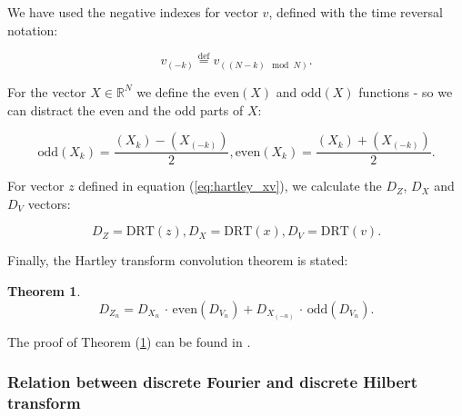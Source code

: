 \documentclass[12pt,twoside,a4paper]{article}
\numberwithin{equation}{subsection}
\numberwithin{figure}{subsection}
\newtheorem{thm}{Theorem}
\begin{document}
We have used the negative indexes for vector $v$, defined with the time reversal notation:

\begin{equation} \label{eq:hartley_negindex}
   v_{(-k)} \stackrel{\mathrm{def}}{=} v_{((N - k) \mod N)} .
\end{equation}

For the vector $X \in \mathbb{R} ^ N $ we define the $ \mathrm{even}(X) $ and $ \mathrm{odd}(X) $ functions - so we can distract the even and the odd parts of $X$:

\begin{subequations} \label{eq:hartley_oddeven}
	\begin{equation} \label{eq:hartley_odd}
		\mathrm{odd}(X_k)  = \frac{(X_k) - (X_{(-k)})}{2} ,
	\end{equation}
	\begin{equation} \label{eq:hartley_even}
		\mathrm{even}(X_k) = \frac{(X_k) + (X_{(-k)})}{2} .
	\end{equation}
\end{subequations}

For vector $z$ defined in equation (\ref{eq:hartley_xv}), we calculate the $D_Z$, $D_X$ and $D_V$ vectors:

\begin{subequations}
	\begin{equation}
		D_Z = \mathrm{DRT}(z),
    \end{equation}
    \begin{equation} 
		D_X = \mathrm{DRT}(x),
	\end{equation}
    \begin{equation} 
		D_V = \mathrm{DRT}(v).
	\end{equation}
\end{subequations}    

Finally, the Hartley transform convolution theorem is stated:

\begin{thm} \label{eq:hartley_theorem}
  \begin{equation}
			D_{Z_n} = D_{X_n}      \, \cdot \, \mathrm{even}(D_{V_n}) 
        	    + D_{X_{(-n)}} \, \cdot \, \mathrm{odd} (D_{V_n}) .
	\end{equation}
\end{thm}

The proof of Theorem (\ref{eq:hartley_theorem}) can be found in \cite{chang_computation}. 

\subsubsection*{Relation between discrete Fourier and discrete Hilbert transform}
\end{document}
